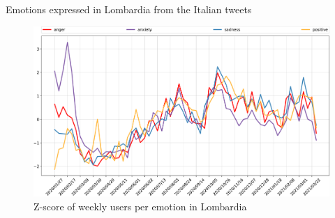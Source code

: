\documentclass[9pt,aspectratio=1610]{beamer}  %
\begin{document}
\begin{frame}{Emotions expressed in Lombardia from the Italian tweets}
    
    \begin{figure}[H]
    	\centering
    	\includegraphics[scale=.30]{assets/img/it_4_categories_lombardia_standardized.svg.pdf}
    	\caption{Z-score of weekly users per emotion in Lombardia}
    	\label{fig:it-4-categories-lombardia-std}
    \end{figure}

\end{frame}
\end{document}
